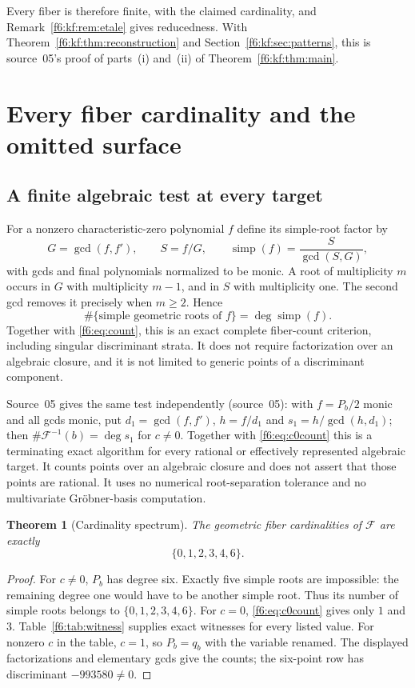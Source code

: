 \documentclass[11pt,a4paper]{article}
\newtheorem{theorem}{Theorem}[section]
\theoremstyle{definition}
\newcommand{\simp}{\operatorname{simp}}
\newcommand{\F}{\mathcal F}
\newcommand{\src}[1]{\textup{(source~#1)}}
\begin{document}
Every fiber is therefore finite, with the claimed cardinality, and
Remark~\ref{f6:kf:rem:etale} gives reducedness. With
Theorem~\ref{f6:kf:thm:reconstruction} and Section~\ref{f6:kf:sec:patterns},
this is source~05's proof of parts~(i) and~(ii) of
Theorem~\ref{f6:kf:thm:main}.

\section{Every fiber cardinality and the omitted surface}
\label{f6:sec:fibers}

\subsection{A finite algebraic test at every target}
For a nonzero characteristic-zero polynomial $f$ define its simple-root
factor by
\begin{equation}\label{f6:eq:simplepart}
 G=\gcd(f,f'),\qquad S=f/G,\qquad
 \simp(f)=\frac{S}{\gcd(S,G)},
\end{equation}
with gcds and final polynomials normalized to be monic. A root of
multiplicity $m$ occurs in $G$ with multiplicity $m-1$, and in $S$ with
multiplicity one. The second gcd removes it precisely when $m\ge2$.
Hence
\[
 \#\{\text{simple geometric roots of }f\}=\deg\simp(f).
\]
Together with \eqref{f6:eq:count}, this is an exact complete fiber-count
criterion, including singular discriminant strata. It does not require
factorization over an algebraic closure, and it is not limited to generic
points of a discriminant component.

Source~05 gives the same test independently \src{05}: with $f=P_b/2$ monic
and all gcds monic, put $d_1=\gcd(f,f')$, $h=f/d_1$ and
$s_1=h/\gcd(h,d_1)$; then $\#\F^{-1}(b)=\deg s_1$ for $c\ne0$. Together with
\eqref{f6:eq:c0count} this is a terminating exact algorithm for every rational
or effectively represented algebraic target. It counts points over an
algebraic closure and does not assert that those points are rational. It uses
no numerical root-separation tolerance and no multivariate Gröbner-basis
computation.

\begin{theorem}[Cardinality spectrum]\label{f6:thm:spectrum}
The geometric fiber cardinalities of $\F$ are exactly
\[
 \boxed{\{0,1,2,3,4,6\}.}
\]
\end{theorem}
\begin{proof}
For $c\ne0$, $P_b$ has degree six. Exactly five simple roots are
impossible: the remaining degree one would have to be another simple
root. Thus its number of simple roots belongs to
$\{0,1,2,3,4,6\}$. For $c=0$, \eqref{f6:eq:c0count} gives only $1$ and $3$.
Table~\ref{f6:tab:witness} supplies exact witnesses for every listed value.
For nonzero $c$ in the table, $c=1$, so $P_b=q_b$ with the variable
renamed. The displayed factorizations and elementary gcds give the
counts; the six-point row has discriminant $-993580\ne0$.
\end{proof}
\end{document}
